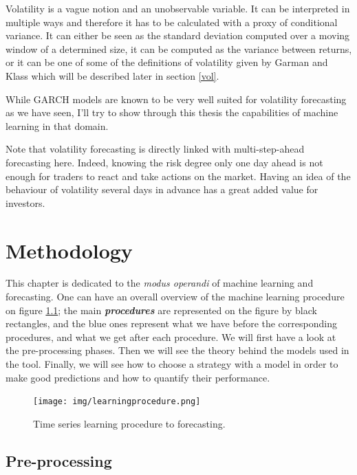 \documentclass[11pt,a4paper,oneside]{book}
\begin{document}
Volatility is a vague notion and an unobservable variable. It can be interpreted in multiple ways and therefore it has to be calculated with a proxy of conditional variance. It can either be seen as the standard deviation computed over a moving window of a determined size, it can be computed as the variance between returns, or it can be one of some of the definitions of volatility given by Garman and Klass \cite{garm} which will be described later in section \ref{vol}.

While GARCH models are known to be very well suited for volatility forecasting as we have seen, I'll try to show through this thesis the capabilities of machine learning in that domain.

Note that volatility forecasting is directly linked with multi-step-ahead forecasting here. Indeed, knowing the risk degree only one day ahead is not enough for traders to react and take actions on the market. Having an idea of the behaviour of volatility several days in advance has a great added value for investors.




\chapter{Methodology}\label{methodo}

This chapter is dedicated to the \textit{modus operandi} of machine learning and forecasting. One can have an overall overview of the machine learning procedure on figure \ref{fig:ML}; the main \textit{\textbf{procedures}} are represented on the figure by black rectangles, and the blue ones represent what we have before the corresponding procedures, and what we get after each procedure. We will first have a look at the pre-processing phases. Then we will see the theory behind the models used in the tool. Finally, we will see how to choose a strategy with a model in order to make good predictions and how to quantify their performance.

\begin{figure}[ht]
  \centering
    \texttt{[image: img/learningprocedure.png]}
  \caption{Time series learning procedure to forecasting.}
  \label{fig:ML}
\end{figure}



\section{Pre-processing}
\end{document}

